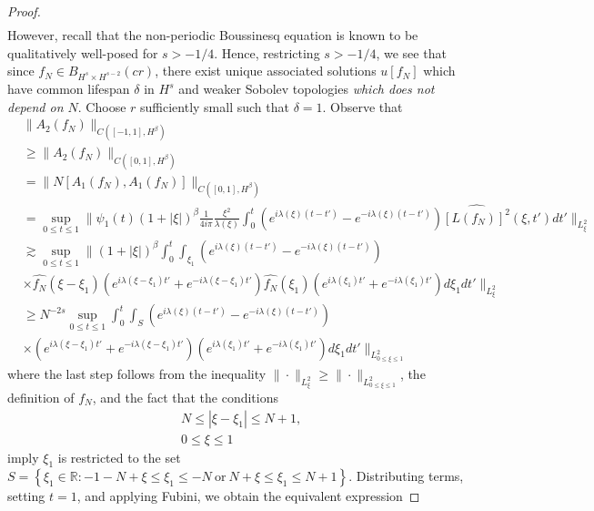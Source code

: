 \documentclass[12pt,reqno]{amsart}
\numberwithin{equation}{section}  %
\newcommand{\rr}{\mathbb{R}}
\newcommand{\wh}{\widehat}
\begin{document}
\begin{proof}
\begin{equation*}
\begin{split}
    \end{split}
\end{equation*}
However, recall that the non-periodic Boussinesq equation is known to be qualitatively well-posed for $s > -1/4$. Hence, restricting $s > -1/4$, we see that since $f_{N} \in B_{H^{s} \times H^{s-2}}(cr)$, there exist unique associated 
solutions $u[f_{N}]$ which have common lifespan $\delta$ in $H^{s}$ and weaker Sobolev topologies \emph{which does not depend
on $N$}. Choose $r$ sufficiently small such that $\delta =1$.  
Observe that
%
%
\begin{equation}
  \label{pol}
\begin{split}
  & \| A_{2}(f_{N}) \|_{C([-1, 1], H^{\beta})} 
  \\
& \ge \| A_{2}(f_{N}) \|_{C([0, 1], H^{\beta})} 
\\
  &  =  \| N[A_{1}(f_{N}), A_{1}(f_{N})] \|_{C([0, 1],
  H^{\beta})} 
  \\
  & = \sup_{0 \le t \le 1} \| \psi_{1}(t) (1 + | \xi |)^{\beta}
  \frac{1}{4 i \pi} \frac{\xi^{2}}{\lambda(\xi)}
  \int_{0}^{t} \left( e^{i\lambda(\xi)(t-t')} - e^{-i\lambda(\xi)(t-t')} \right)
  \wh{[L(f_{N})]^{2}}(\xi, t') dt' \|_{L^{2}_{\xi}}
  \\
  & \gtrsim \sup_{0 \le t \le 1} \| (1 + | \xi |)^{\beta}
  \int_{0}^{t} \int_{\xi_{1}} \left( e^{i\lambda(\xi)(t-t')} - e^{-i\lambda(\xi)(t-t')} \right)
  \\
  & \times \wh{f_{N}}(\xi - \xi_{1})\left( e^{i\lambda(\xi - \xi_{1})t'} +
  e^{-i\lambda(\xi - \xi_{1})t'} \right)
  \wh{f_{N}}(\xi_{1})\left( e^{i \lambda(\xi_{1})t'} +
  e^{-i \lambda(\xi_{1})t'} \right) 
  d \xi_{1} dt' \|_{L^{2}_{\xi}}
  \\
  & \ge N^{-2s} \sup_{0 \le t \le 1} 
  \int_{0}^{t} \int_{S} \left( e^{i\lambda(\xi)(t-t')} - e^{-i\lambda(\xi)(t-t')} \right)
  \\
  & \times \left( e^{i\lambda(\xi - \xi_{1})t'} +
  e^{-i\lambda(\xi - \xi_{1})t'} \right)
  \left( e^{i \lambda(\xi_{1})t'} +
  e^{-i \lambda(\xi_{1})t'} \right) 
  d \xi_{1} dt' \|_{L^{2}_{0 \le \xi \le 1}}
   \end{split}
\end{equation}
%
%
where the last step follows from the inequality $\| \cdot \|_{L^{2}_{\xi}} \ge \| \cdot \|_{L^{2}_{0 \le \xi \le 1}}$, the definition of $f_{N}$, and the fact that 
the conditions
%
%
\begin{equation*}
\begin{split}
  & N \le | \xi - \xi_{1} | \le N+1,
  \\
& 0 \le \xi \le 1
\end{split}
\end{equation*}
%
%
imply $\xi_{1}$ is restricted to the set $S = \left\{ \xi_{1} \in \rr: -1 - N + \xi \le  \xi_{1} \le -N \ \text{or} \ N + \xi \le \xi_{1} \le N+1 \right\}$.
Distributing terms, setting $t=1$, and applying Fubini, we obtain the equivalent expression


\end{proof}
\end{document}
